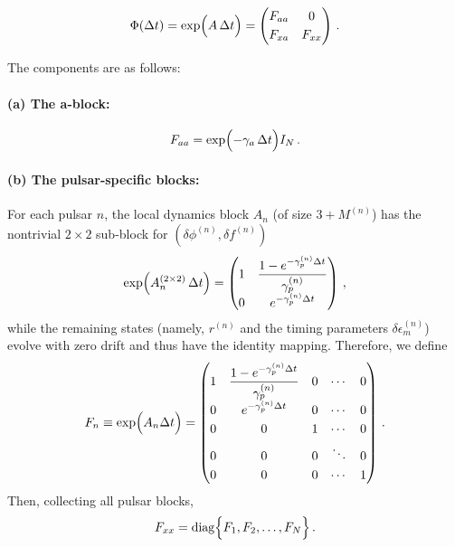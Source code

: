 \documentclass[]{scrartcl}
\begin{document}
\begin{equation}
	\Phi(\Delta t) = \exp\Bigl(A\,\Delta t\Bigr)
	= \begin{pmatrix}
	F_{aa} & 0 \\[1mm]
	F_{xa} & F_{xx}
	\end{pmatrix}\,.
	\end{equation}
	
	The components are as follows:
	
	\paragraph{(a) The a-block:}
	\begin{equation}
	F_{aa} = \exp\Bigl(-\gamma_a\,\Delta t\Bigr) I_N \,.
	\end{equation}
	
	\paragraph{(b) The pulsar-specific blocks:}  
	For each pulsar \(n\), the local dynamics block \(A_n\) (of size \(3+M^{(n)}\)) has the nontrivial \(2\times2\) sub-block for \((\delta\phi^{(n)},\delta f^{(n)})\)
	\begin{equation}
	\exp\Bigl(A_n^{(2\times2)}\,\Delta t\Bigr)
	= \begin{pmatrix}
	1 & \dfrac{1 - e^{-\gamma_p^{(n)} \Delta t}}{\gamma_p^{(n)}} \\[1mm]
	0 & e^{-\gamma_p^{(n)} \Delta t}
	\end{pmatrix}\,,
	\end{equation}
	while the remaining states (namely, \(r^{(n)}\) and the timing parameters \(\delta\epsilon_m^{(n)}\)) evolve with zero drift and thus have the identity mapping. Therefore, we define
	\begin{equation}
	F_n \equiv \exp\Bigl(A_n \Delta t\Bigr)
	= \begin{pmatrix}
	1 & \dfrac{1 - e^{-\gamma_p^{(n)} \Delta t}}{\gamma_p^{(n)}} & 0 & \cdots & 0 \\[1mm]
	0 & e^{-\gamma_p^{(n)} \Delta t} & 0 & \cdots & 0 \\[1mm]
	0 & 0 & 1 & \cdots & 0 \\[1mm]
	0 & 0 & 0 & \ddots & 0 \\[1mm]
	0 & 0 & 0 & \cdots & 1
	\end{pmatrix}\,.
	\end{equation}
	Then, collecting all pulsar blocks,
	\begin{equation}
	F_{xx} = \mathrm{diag}\Bigl\{ F_1, F_2, \dots, F_N \Bigr\}\,.
	\end{equation}
	
\end{document}
